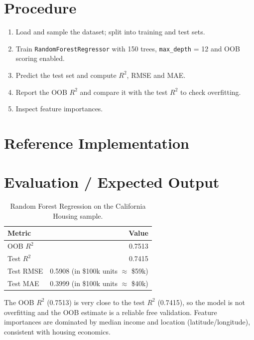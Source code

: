 \section{Procedure}
\begin{enumerate}
  \item Load and sample the dataset; split into training and test sets.
  \item Train \texttt{RandomForestRegressor} with 150 trees, \texttt{max\_depth} = 12 and
        OOB scoring enabled.
  \item Predict the test set and compute $R^2$, RMSE and MAE.
  \item Report the OOB $R^2$ and compare it with the test $R^2$ to check overfitting.
  \item Inspect feature importances.
\end{enumerate}

\section{Reference Implementation}


\section{Evaluation / Expected Output}
\begin{table}[htbp]
  \centering
  \caption{Random Forest Regression on the California Housing sample.}
  \begin{tabular}{|l|r|}
    \hline
\rowcolor{mlblue!8}    \textbf{Metric} & \textbf{Value} \\
    \hline
    OOB $R^2$ & 0.7513 \\
\hline
    Test $R^2$ & 0.7415 \\
\hline
    Test RMSE & 0.5908 (in \$100k units $\approx$ \$59k) \\
\hline
    Test MAE & 0.3999 (in \$100k units $\approx$ \$40k) \\
    \hline
  \end{tabular}
\end{table}

The OOB $R^2$ (0.7513) is very close to the test $R^2$ (0.7415), so the model is not
overfitting and the OOB estimate is a reliable free validation. Feature importances are
dominated by median income and location (latitude/longitude), consistent with housing
economics.

